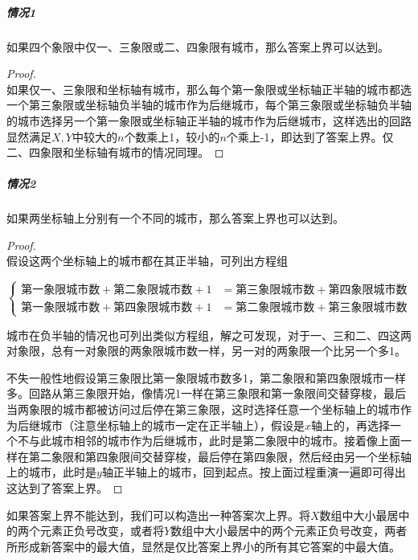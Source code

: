 \documentclass[UTF8]{ctexart}
\theoremstyle{nonumberplain}
\newtheorem{proof}{\hspace{1em}证明：}
\begin{document}
			\subparagraph{情况1}
			如果四个象限中仅一、三象限或二、四象限有城市，那么答案上界可以达到。
			
			\begin{proof}\mbox{}\\
			
				如果仅一、三象限和坐标轴有城市，那么每个第一象限或坐标轴正半轴的城市都选一个第三象限或坐标轴负半轴的城市作为后继城市，每个第三象限或坐标轴负半轴的城市选择另一个第一象限或坐标轴正半轴的城市作为后继城市，这样选出的回路显然满足$X,Y$中较大的$n$个数乘上1，较小的$n$个乘上-1，即达到了答案上界。仅二、四象限和坐标轴有城市的情况同理。
			\end{proof}
			
			\subparagraph{情况2}
			如果两坐标轴上分别有一个不同的城市，那么答案上界也可以达到。
			
			\begin{proof}\mbox{}\\
			
				假设这两个坐标轴上的城市都在其正半轴，可列出方程组
				
				$$\left\{\begin{aligned}
					\mbox{第一象限城市数}+\mbox{第二象限城市数}+1&=\mbox{第三象限城市数}+\mbox{第四象限城市数}\\
					\mbox{第一象限城市数}+\mbox{第四象限城市数}+1&=\mbox{第二象限城市数}+\mbox{第三象限城市数}
				\end{aligned}\right.$$
				
				城市在负半轴的情况也可列出类似方程组，解之可发现，对于一、三和二、四这两对象限，总有一对象限的两象限城市数一样，另一对的两象限一个比另一个多1。
				
				不失一般性地假设第三象限比第一象限城市数多1，第二象限和第四象限城市一样多。回路从第三象限开始，像情况1一样在第三象限和第一象限间交替穿梭，最后当两象限的城市都被访问过后停在第三象限，这时选择任意一个坐标轴上的城市作为后继城市（注意坐标轴上的城市一定在正半轴上），假设是$x$轴上的，再选择一个不与此城市相邻的城市作为后继城市，此时是第二象限中的城市。接着像上面一样在第二象限和第四象限间交替穿梭，最后停在第四象限，然后经由另一个坐标轴上的城市，此时是$y$轴正半轴上的城市，回到起点。按上面过程重演一遍即可得出这达到了答案上界。
			\end{proof}
			
			如果答案上界不能达到，我们可以构造出一种答案次上界。将$X$数组中大小最居中的两个元素正负号改变，或者将$Y$数组中大小最居中的两个元素正负号改变，两者所形成新答案中的最大值，显然是仅比答案上界小的所有其它答案的中最大值。
			
\end{document}
